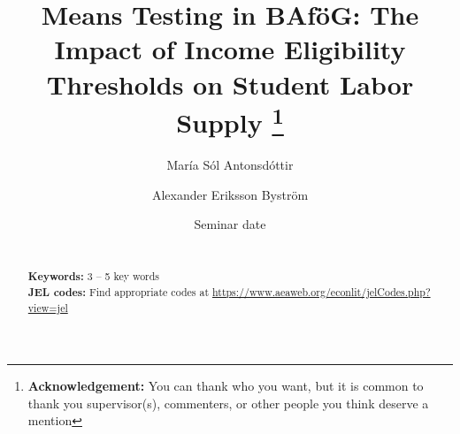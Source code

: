 \documentclass[a4paper, 12pt]{article}
\title{Means Testing in BAföG: The Impact of Income Eligibility Thresholds on Student Labor Supply
\footnote{\textbf{Acknowledgement:} You can thank who you want, but it is common to thank you supervisor(s), commenters, or other people you think deserve a mention
}}
\author{
María Sól Antonsdóttir 
\and 
Alexander Eriksson Byström
}
\date{Seminar date}
\begin{document}

\newpage
\begin{abstract}
\lipsum[1] \\
    \noindent \textbf{Keywords:}  3 -- 5 key words\\
    \noindent \textbf{JEL codes:} Find appropriate codes at
    \url{https://www.aeaweb.org/econlit/jelCodes.php?view=jel}  %
\end{abstract}
\newpage
\setcounter{page}{1}

\hypersetup{linkcolor=blue}




\titleformat{\section}{\normalfont\huge\bfseries}{\thesection}{1em}{} 
\newpage
{} 

\newpage

\appendix
\setcounter{page}{1} %



\end{document}
